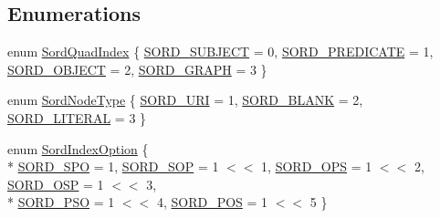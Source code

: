 \subsection*{Enumerations}
\begin{DoxyCompactItemize}
\item 
enum \hyperlink{group__sord_gad8ed181fe76f9085ba4188988527c633}{Sord\+Quad\+Index} \{ \hyperlink{group__sord_ggad8ed181fe76f9085ba4188988527c633a7329717c7624be0d208bdc20c236e33d}{S\+O\+R\+D\+\_\+\+S\+U\+B\+J\+E\+CT} = 0, 
\hyperlink{group__sord_ggad8ed181fe76f9085ba4188988527c633a0df0a36753303d1d8a55487296a050bb}{S\+O\+R\+D\+\_\+\+P\+R\+E\+D\+I\+C\+A\+TE} = 1, 
\hyperlink{group__sord_ggad8ed181fe76f9085ba4188988527c633a42de0f7687921dc2cd840a122636ff13}{S\+O\+R\+D\+\_\+\+O\+B\+J\+E\+CT} = 2, 
\hyperlink{group__sord_ggad8ed181fe76f9085ba4188988527c633abbbc8097939ddffc0c29cf266a75ba34}{S\+O\+R\+D\+\_\+\+G\+R\+A\+PH} = 3
 \}
\item 
enum \hyperlink{group__sord_ga69e82f5abb700cfbde0c9ee8d3574154}{Sord\+Node\+Type} \{ \hyperlink{group__sord_gga69e82f5abb700cfbde0c9ee8d3574154a7335bbadcb5084cedd7957d7d772aaa5}{S\+O\+R\+D\+\_\+\+U\+RI} = 1, 
\hyperlink{group__sord_gga69e82f5abb700cfbde0c9ee8d3574154aa469e5ec95b931bc4c5adaa7752b9f0a}{S\+O\+R\+D\+\_\+\+B\+L\+A\+NK} = 2, 
\hyperlink{group__sord_gga69e82f5abb700cfbde0c9ee8d3574154a9d48171e6a7a4b4533af3539052d6dfd}{S\+O\+R\+D\+\_\+\+L\+I\+T\+E\+R\+AL} = 3
 \}
\item 
enum \hyperlink{group__sord_gaf490691787913fb85293d05eab00a735}{Sord\+Index\+Option} \{ \\*
\hyperlink{group__sord_ggaf490691787913fb85293d05eab00a735a51f0e1357612884f7bb7fb3ab151b3a7}{S\+O\+R\+D\+\_\+\+S\+PO} = 1, 
\hyperlink{group__sord_ggaf490691787913fb85293d05eab00a735a0563a6b699e660c4af64090ea78b15f1}{S\+O\+R\+D\+\_\+\+S\+OP} = 1 $<$$<$ 1, 
\hyperlink{group__sord_ggaf490691787913fb85293d05eab00a735a4220624a00f2828d33e1a1cd45e18634}{S\+O\+R\+D\+\_\+\+O\+PS} = 1 $<$$<$ 2, 
\hyperlink{group__sord_ggaf490691787913fb85293d05eab00a735aa569988c75894fb61b19640d0a0c7fd7}{S\+O\+R\+D\+\_\+\+O\+SP} = 1 $<$$<$ 3, 
\\*
\hyperlink{group__sord_ggaf490691787913fb85293d05eab00a735a6aeeb1ec2f793f490e7df6f40527b550}{S\+O\+R\+D\+\_\+\+P\+SO} = 1 $<$$<$ 4, 
\hyperlink{group__sord_ggaf490691787913fb85293d05eab00a735a525ecd60da9d897e74b683f8b50c911d}{S\+O\+R\+D\+\_\+\+P\+OS} = 1 $<$$<$ 5
 \}
\end{DoxyCompactItemize}
